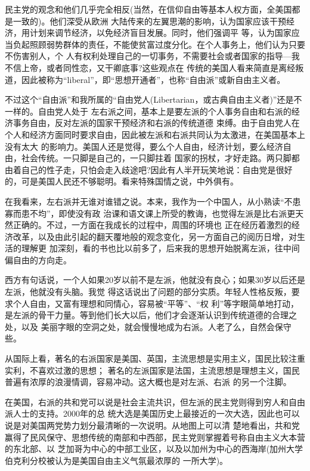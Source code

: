 ﻿\documentclass[11pt]{article}
\begin{document}
民主党的观念和他们几乎完全相反(当然，在信仰自由等基本人权方面，全美国都是一致的)。他们深受从欧洲
大陆传来的左翼思潮的影响，认为国家应该干预经济，用计划来调节经济，以免经济盲目发展。同时，他们强调平
等，认为国家应当负起照顾弱势群体的责任，不能使贫富过度分化。在个人事务上，他们认为只要不伤害别人，个
人有权利处理自己的一切事务，不需要社会或者国家的指导---我不信上帝，或者同性恋，又干卿底事?这些观点在
传统的美国人看来简直是离经叛道，因此被称为``liberal''，即``思想开通者''，也称``自由派''或新自由主义者。

不过这个``自由派''和我所属的``自由党人(Libertarian，或古典自由主义者)''还是不一样的。自由党人处于
左右派之间，基本上是要左派的个人事务自由和右派的经济事务自由，反对左派的国家干预经济和右派的传统道德
束缚。由于自由党人在个人和经济方面同时要求自由，因此被左派和右派共同认为太激进，在美国基本上没有太大
的影响力。美国人还是觉得，要么个人自由，经济计划，要么经济自由，社会传统。一只脚是自己的，一只脚拄着
国家的拐杖，才好走路。两只脚都由着自己的性子走，只怕会走入歧途吧?因此有人半开玩笑地说：自由党是很好
的，可是美国人民还不够聪明。看来特殊国情之说，中外俱有。

在我看来，左右派并无谁对谁错之说。本来，我作为一个中国人，从小熟读``不患寡而患不均''，即使没有政
治课和语文课上所受的教诲，也觉得左派是比右派更天然正确的。不过，一方面在我成长的过程中，周围的环境也
正在经历着激烈的经济改革，以及由此引起的翻天覆地般的观念变化，另一方面自己的阅历日增，对生活的理解更
加深刻，看的书也比以前多了，后来我的思想开始脱离左派，往中间偏自由的方向走。

西方有句话说，一个人如果20岁以前不是左派，他就没有良心；如果30岁以后还是左派，他就没有头脑。我觉
得这话说出了问题的部分实质。年轻人性格反叛，要求个人自由，又富有理想和同情心，容易被``平等''、``权
利''等字眼简单地打动，是左派的骨干力量。等到他们长大以后，他们才会逐渐认识到传统道德的合理之处，以及
美丽字眼的空洞之处，就会慢慢地成为右派。人老了么，自然会保守些。

从国际上看，著名的右派国家是美国、英国，主流思想是实用主义，国民比较注重实利，不喜欢过激的思想；
著名的左派国家是法国，主流思想是理想主义，国民普遍有浓厚的浪漫情调，容易冲动。这大概也是对左派、右派
的另一个注脚。

在美国，右派的共和党可以说是社会主流共识，但左派的民主党则得到穷人和自由派人士的支持。2000年的总
统大选是美国历史上最接近的一次大选，因此也可以说是对美国两党势力划分最清晰的一次说明。从地图上可以清
楚地看出，共和党赢得了民风保守、思想传统的南部和中西部，民主党则掌握着号称自由主义大本营的东北部、以
芝加哥为中心的中部工业区，以及以加州为中心的西海岸(加州大学伯克利分校被认为是美国自由主义气氛最浓厚的
一所大学)。
\end{document}
